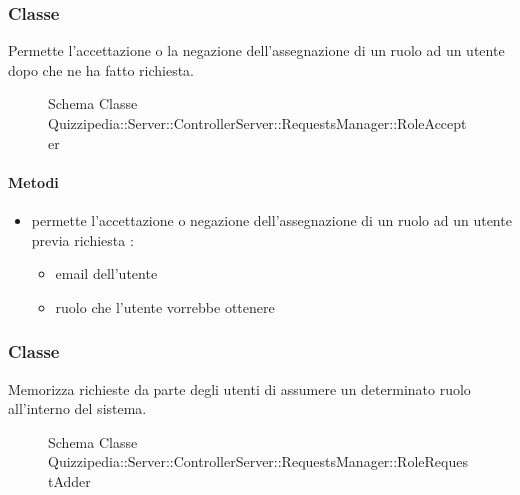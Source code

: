 \subsubsection{Classe }
Permette l'accettazione o la negazione dell'assegnazione di un ruolo ad un utente dopo che ne ha fatto richiesta.
\begin{figure}[H]
\centering
\noindent{}
\caption[Schema Classe RoleAccepter]{Schema Classe Quizzipedia::Server::ControllerServer::RequestsManager::RoleAccepter}
\end{figure}
\paragraph{Metodi}
\begin{itemize}
\item {}
\newline
permette l'accettazione o negazione dell'assegnazione di un ruolo ad un utente previa richiesta
\newline
{} :
\begin{itemize}
\item {}
\newline
email dell'utente
\item {}
\newline
ruolo che l'utente vorrebbe ottenere
\end{itemize}
\end{itemize}
\subsubsection{Classe }
Memorizza richieste da parte degli utenti di assumere un determinato ruolo all'interno del sistema.
\begin{figure}[H]
\centering
\noindent{}
\caption[Schema Classe RoleRequestAdder]{Schema Classe Quizzipedia::Server::ControllerServer::RequestsManager::RoleRequestAdder}
\end{figure}
